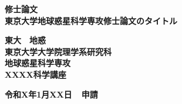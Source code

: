 \begin{titlepage}
\begin{spacing}{2.3}

\begin{center}
\vspace*{30truemm}
\fontsize{18pt}{10pt}\selectfont
\textbf{修士論文}\\
\vspace*{30truemm}
\fontsize{20pt}{9pt}\selectfont
\textbf{東京大学地球惑星科学専攻修士論文のタイトル}
\vspace{50truemm}
\fontsize{16pt}{0pt}\selectfont

\textbf{東大　地惑}\\ %
\vspace{15truemm}
\textbf{東京大学大学院理学系研究科}\\ %
\vspace{10truemm}
\textbf{地球惑星科学専攻}\\ %
\vspace{10truemm}
\textbf{XXXX科学講座}\\
\vspace{30truemm}

\textbf{令和X年1月XX日~~申請}\\ %
\end{center}

\end{spacing}
\end{titlepage}